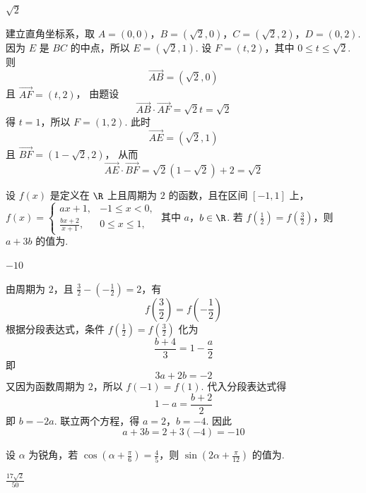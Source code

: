 \begin{answer}
\(\sqrt{2}\)
\end{answer}

\begin{solution}
建立直角坐标系，取 \(A=(0,0)\)，\(B=(\sqrt{2},0)\)，\(C=(\sqrt{2},2)\)，\(D=(0,2)\). 因为 \(E\) 是 \(BC\) 的中点，所以 \(E=(\sqrt{2},1)\). 设 \(F=(t,2)\)，其中 \(0\leqslant t\leqslant\sqrt{2}\). 则
\[
\overrightarrow{AB}=(\sqrt{2},0)
\]
且 \(\overrightarrow{AF}=(t,2)\)，
由题设
\[
\overrightarrow{AB}\cdot\overrightarrow{AF}=\sqrt{2}t=\sqrt{2}
\]
得 \(t=1\)，所以 \(F=(1,2)\). 此时
\[
\overrightarrow{AE}=(\sqrt{2},1)
\]
且 \(\overrightarrow{BF}=(1-\sqrt{2},2)\)，
从而
\[
\overrightarrow{AE}\cdot\overrightarrow{BF}=\sqrt{2}(1-\sqrt{2})+2=\sqrt{2}
\]
\end{solution}

\begin{problem}
设 \(f(x)\) 是定义在 \(\R\) 上且周期为 \(2\) 的函数，且在区间 \([-1,1]\) 上， \(f(x)=\begin{cases}
ax+1, & -1 \leqslant x < 0,\\
\frac{bx+2}{x+1}, & 0 \leqslant x \leqslant 1,
\end{cases}\)
其中 \(a\)，\(b \in \R\). 若 \(f\left(\frac{1}{2}\right)=f\left(\frac{3}{2}\right)\)，则 \(a + 3b\) 的值为\fillinblank{}.
\end{problem}

\begin{answer}
\(-10\)
\end{answer}

\begin{solution}
由周期为 \(2\)，且 \(\frac{3}{2}-\left(-\frac{1}{2}\right)=2\)，有
\[
f\left(\frac{3}{2}\right)=f\left(-\frac{1}{2}\right)
\]
根据分段表达式，条件 \(f\left(\frac{1}{2}\right)=f\left(\frac{3}{2}\right)\) 化为
\[
\frac{b+4}{3}=1-\frac{a}{2}
\]
即
\[
3a+2b=-2
\]
又因为函数周期为 \(2\)，所以 \(f(-1)=f(1)\). 代入分段表达式得
\[
1-a=\frac{b+2}{2}
\]
即 \(b=-2a\). 联立两个方程，得 \(a=2\)，\(b=-4\). 因此
\[
a+3b=2+3(-4)=-10
\]
\end{solution}

\begin{problem}
设 \(\alpha\) 为锐角，若 \(\cos\left(\alpha + \frac{\pi}{6}\right)=\frac{4}{5}\)，则 \(\sin\left(2\alpha + \frac{\pi}{12}\right)\) 的值为\fillinblank{}.
\end{problem}

\begin{answer}
\(\frac{17\sqrt{2}}{50}\)
\end{answer}

